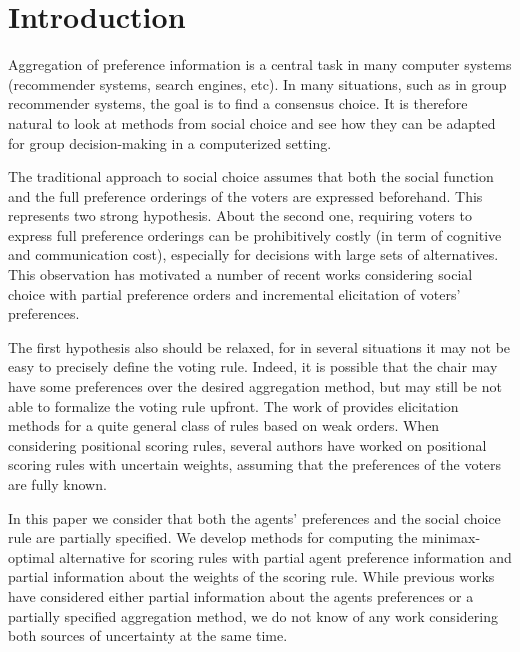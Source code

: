 \section{Introduction}
Aggregation of preference information is a central task in many computer systems (recommender systems, search engines, etc).
In many situations, such as in group recommender systems, the goal is to find a consensus choice.
It is therefore natural to look at methods from social choice and see how they can be adapted for group decision-making in a computerized setting.

The traditional approach to social choice assumes that both the social function and the full preference orderings of the voters are expressed beforehand. This represents two strong hypothesis.
About the second one, requiring voters to express full preference orderings can be prohibitively costly (in term of cognitive and communication cost), especially for decisions with large sets of alternatives.
This observation has motivated a number of recent works considering social choice with partial preference orders  \citep{Xia2008,Pini2009,Konczak05} and incremental elicitation \citep{Kalech2011, Lu2011, Naamani-Dery2015} of voters’ preferences. 

The first hypothesis also should be relaxed, for in several situations it may not be easy to precisely define the voting rule.
Indeed, it is possible that the chair may have some preferences over the desired aggregation method, but may still be not able to formalize the voting rule upfront.
The work of \citet{Cailloux2014} provides elicitation methods for a quite general class of rules based on weak orders.
When considering positional scoring rules, several authors \citep{Stein1994, Llamazares2013, Viappiani2018} have worked on positional scoring rules with uncertain weights, assuming that the preferences of the voters are fully known.

In this paper we consider that both the agents’ preferences and the social choice rule are partially specified.
We develop methods for computing the minimax-optimal alternative for scoring rules with partial agent preference information and partial information about the weights of the scoring rule.
While previous works have considered either partial information about the agents preferences or a partially specified aggregation method, we do not know of any work considering both sources of uncertainty at the same time.

